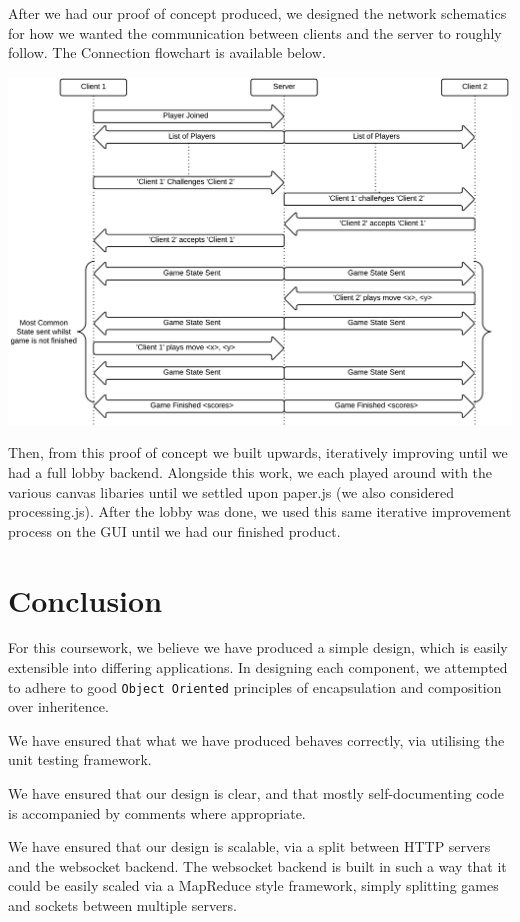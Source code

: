 \documentclass[a4wide, 11pt]{article}
\begin{document}
After we had our proof of concept produced, we designed the network schematics for how we wanted the communication between clients and the server to roughly follow. The Connection flowchart is available below.

\includegraphics[width=\textwidth]{ConnectionFlowchart.png}


Then, from this proof of concept we built upwards, iteratively improving until we had a full lobby backend. Alongside this work, we each played around with the various canvas libaries until we settled upon paper.js (we also considered processing.js). After the lobby was done, we used this same iterative improvement process on the GUI until we had our finished product.

\section{Conclusion}

For this coursework, we believe we have produced a simple design, which is easily extensible into differing applications. In designing each component, we attempted to adhere to good \texttt{Object Oriented} principles of encapsulation and composition over inheritence.

We have ensured that what we have produced behaves correctly, via utilising the unit testing framework. 

We have ensured that our design is clear, and that mostly self-documenting code is accompanied by comments where appropriate.

We have ensured that our design is scalable, via a split between HTTP servers and the websocket backend. The websocket backend is built in such a way that it could be easily scaled via a MapReduce style framework, simply splitting games and sockets between multiple servers.
\end{document}
